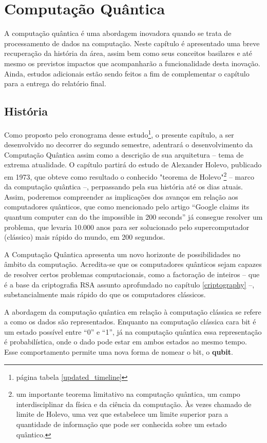 \section{Computação Quântica} 
\label{quantum_comp}

A computação quântica é uma abordagem inovadora quando se trata de processamento de dados na computação. Neste capítulo é apresentado uma breve recuperação da história da área, assim bem como seus conceitos basilares e até mesmo os previstos impactos que acompanharão a funcionalidade desta inovação. Ainda, estudos adicionais estão sendo feitos a fim de complementar o capítulo para a entrega do relatório final.

\subsection{História}
Como proposto pelo cronograma desse estudo\footnote{página \pageref{updated_timeline} tabela \ref{updated_timeline}}, o presente capítulo, a ser desenvolvido no decorrer do segundo semestre, adentrará o desenvolvimento da Computação Quântica assim como a descrição de sua arquitetura – tema de extrema atualidade. O capítulo partirá do estudo de Alexander Holevo, publicado em 1973, que obteve como resultado o conhecido "teorema de Holevo"\footnote{um importante teorema limitativo na computação quântica, um campo interdisciplinar da física e da ciência da computação. Às vezes chamado de limite de Holevo, uma vez que estabelece um limite superior para a quantidade de informação que pode ser conhecida sobre um estado quântico.} – marco da computação quântica –, perpassando pela sua história até os dias atuais. Assim, poderemos compreender as implicações dos avanços em relação aos computadores quânticos, que como mencionado pelo artigo “Google claims its quantum computer can do the impossible in 200 seconds” \cite{16} já consegue resolver um problema, que levaria 10.000 anos para ser solucionado pelo supercomputador (clássico) mais rápido do mundo, em 200 segundos.

A Computação Quântica apresenta um novo horizonte de possibilidades no âmbito da computação. Acredita-se que os computadores quânticos sejam capazes de resolver certos problemas computacionais, como a factoração de inteiros – que é a base da criptografia RSA assunto aprofundado no capítulo \ref{criptography} –, substancialmente mais rápido do que os computadores clássicos.

A abordagem da computação quântica em relação à computação clássica se refere a como os dados são representados. Enquanto na computação clássica cara bit é um estado possível entre ``0'' e ``1'', já na computação quântica essa representação é probabilística, onde o dado pode estar em ambos estados ao mesmo tempo. Esse comportamento permite uma nova forma de nomear o bit, o \textbf{qubit}.

